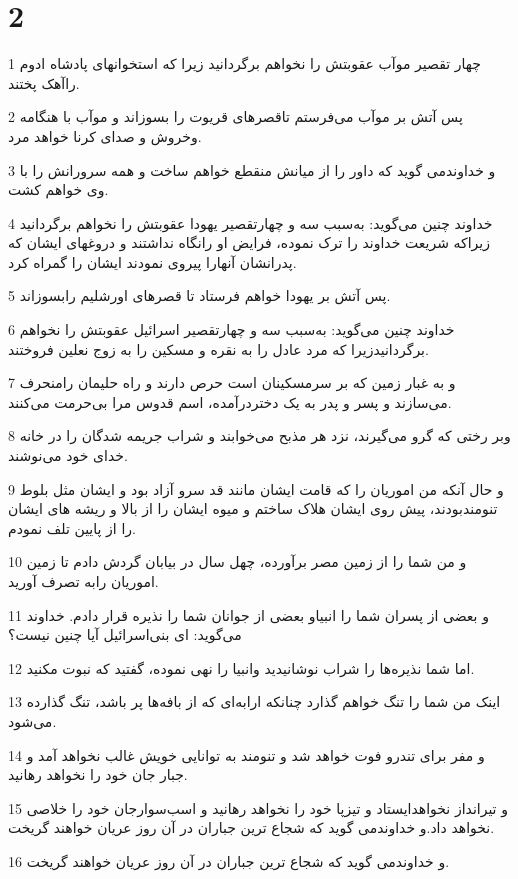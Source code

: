 \chapter{2}

\par 1 چهار تقصیر موآب عقوبتش را نخواهم برگردانید زیرا که استخوانهای پادشاه ادوم راآهک پختند.
\par 2 پس آتش بر موآب می‌فرستم تاقصرهای قریوت را بسوزاند و موآب با هنگامه وخروش و صدای کرنا خواهد مرد.
\par 3 و خداوندمی گوید که داور را از میانش منقطع خواهم ساخت و همه سرورانش را با وی خواهم کشت.
\par 4 خداوند چنین می‌گوید: به‌سبب سه و چهارتقصیر یهودا عقوبتش را نخواهم برگردانید زیراکه شریعت خداوند را ترک نموده، فرایض او رانگاه نداشتند و دروغهای ایشان که پدرانشان آنهارا پیروی نمودند ایشان را گمراه کرد.
\par 5 پس آتش بر یهودا خواهم فرستاد تا قصرهای اورشلیم رابسوزاند.
\par 6 خداوند چنین می‌گوید: به‌سبب سه و چهارتقصیر اسرائیل عقوبتش را نخواهم برگردانیدزیرا که مرد عادل را به نقره و مسکین را به زوج نعلین فروختند.
\par 7 و به غبار زمین که بر سرمسکینان است حرص دارند و راه حلیمان رامنحرف می‌سازند و پسر و پدر به یک دختردرآمده، اسم قدوس مرا بی‌حرمت می‌کنند.
\par 8 وبر رختی که گرو می‌گیرند، نزد هر مذبح می‌خوابند و شراب جریمه شدگان را در خانه خدای خود می‌نوشند.
\par 9 و حال آنکه من اموریان را که قامت ایشان مانند قد سرو آزاد بود و ایشان مثل بلوط تنومندبودند، پیش روی ایشان هلاک ساختم و میوه ایشان را از بالا و ریشه های ایشان را از پایین تلف نمودم.
\par 10 و من شما را از زمین مصر برآورده، چهل سال در بیابان گردش دادم تا زمین اموریان رابه تصرف آورید.
\par 11 و بعضی از پسران شما را انبیاو بعضی از جوانان شما را نذیره قرار دادم. خداوند می‌گوید: ای بنی‌اسرائیل آیا چنین نیست؟
\par 12 اما شما نذیره‌ها را شراب نوشانیدید وانبیا را نهی نموده، گفتید که نبوت مکنید.
\par 13 اینک من شما را تنگ خواهم گذارد چنانکه ارابه‌ای که از بافه‌ها پر باشد، تنگ گذارده می‌شود.
\par 14 و مفر برای تندرو فوت خواهد شد و تنومند به توانایی خویش غالب نخواهد آمد و جبار جان خود را نخواهد رهانید.
\par 15 و تیرانداز نخواهدایستاد و تیزپا خود را نخواهد رهانید و اسب‌سوارجان خود را خلاصی نخواهد داد.و خداوندمی گوید که شجاع ترین جباران در آن روز عریان خواهند گریخت.
\par 16 و خداوندمی گوید که شجاع ترین جباران در آن روز عریان خواهند گریخت.

